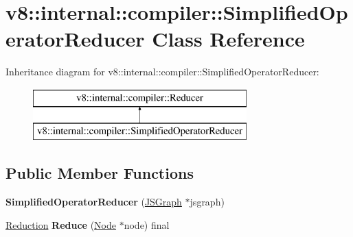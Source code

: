 \hypertarget{classv8_1_1internal_1_1compiler_1_1_simplified_operator_reducer}{}\section{v8\+:\+:internal\+:\+:compiler\+:\+:Simplified\+Operator\+Reducer Class Reference}
\label{classv8_1_1internal_1_1compiler_1_1_simplified_operator_reducer}
Inheritance diagram for v8\+:\+:internal\+:\+:compiler\+:\+:Simplified\+Operator\+Reducer\+:\begin{figure}[H]
\begin{center}
\leavevmode
\includegraphics[height=2.000000cm]{classv8_1_1internal_1_1compiler_1_1_simplified_operator_reducer}
\end{center}
\end{figure}
\subsection*{Public Member Functions}
\begin{DoxyCompactItemize}
\item 
{\bfseries Simplified\+Operator\+Reducer} (\hyperlink{classv8_1_1internal_1_1compiler_1_1_j_s_graph}{J\+S\+Graph} $\ast$jsgraph)\hypertarget{classv8_1_1internal_1_1compiler_1_1_simplified_operator_reducer_a0d0fa978dfb5a6b865a87dfbaa55636f}{}\label{classv8_1_1internal_1_1compiler_1_1_simplified_operator_reducer_a0d0fa978dfb5a6b865a87dfbaa55636f}

\item 
\hyperlink{classv8_1_1internal_1_1compiler_1_1_reduction}{Reduction} {\bfseries Reduce} (\hyperlink{classv8_1_1internal_1_1compiler_1_1_node}{Node} $\ast$node) final\hypertarget{classv8_1_1internal_1_1compiler_1_1_simplified_operator_reducer_a8ef4168530bf93070596299768ac3fa0}{}\label{classv8_1_1internal_1_1compiler_1_1_simplified_operator_reducer_a8ef4168530bf93070596299768ac3fa0}

\end{DoxyCompactItemize}

